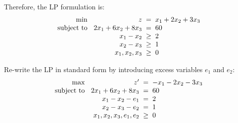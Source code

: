 \documentclass[a4paper, 10pt]{article}
\begin{document}
\begin{tosubmit}
Therefore, the LP formulation is:
\[
\begin{array}{@{\hspace{2mm}} r @{\hspace{2mm}} r @{\hspace{2mm}} c @{\hspace{2mm}} l}
    \text{min } & z & = & x_1 + 2x_2 + 3x_3 \\
    \text{subject to } & 2x_1 + 6x_2 + 8x_3 & = & 60 \\
    & x_1 - x_2 & \geq & 2 \\
    & x_2 - x_3 & \geq & 1 \\
    & x_1, x_2, x_3 & \geq & 0
\end{array}
\]

Re-write the LP in standard form by introducing excess variables \( e_1 \) and \( e_2 \):
\[
\begin{array}{@{\hspace{2mm}} r @{\hspace{2mm}} r @{\hspace{2mm}} c @{\hspace{2mm}} l}
    \text{max } & z' & = & -x_1 - 2x_2 - 3x_3 \\
    \text{subject to } & 2x_1 + 6x_2 + 8x_3 & = & 60 \\
    & x_1 - x_2 - e_1 & = & 2 \\
    & x_2 - x_3 - e_2 & = & 1 \\
    & x_1, x_2, x_3, e_1, e_2 & \geq & 0
\end{array}
\]

\newpage


\end{tosubmit}
\end{document}
